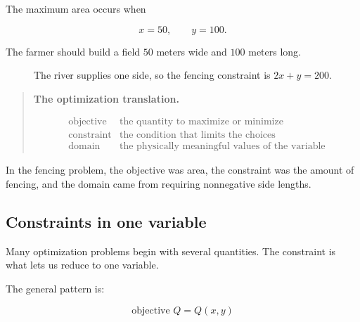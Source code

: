 The maximum area occurs when

\[
\boxed{
x=50,\qquad y=100.
}
\]

The farmer should build a field \(50\) meters wide and \(100\) meters long.

\begin{figure}[h]
\centering
{}
\caption{The river supplies one side, so the fencing constraint is \(2x+y=200\).}
\label{fig:fence-river-optimization}
\end{figure}

\begin{quote}
\textbf{The optimization translation.}

\[
\begin{array}{ll}
\text{objective} & \text{the quantity to maximize or minimize} \\
\text{constraint} & \text{the condition that limits the choices} \\
\text{domain} & \text{the physically meaningful values of the variable}
\end{array}
\]
\end{quote}

In the fencing problem, the objective was area, the constraint was the amount of fencing,
and the domain came from requiring nonnegative side lengths.

\subsection{Constraints in one variable}
\label{subsec:constraints-one-variable}

Many optimization problems begin with several quantities.  The constraint is what lets us
reduce to one variable.

The general pattern is:

\[
\text{objective } Q=Q(x,y)
\]

